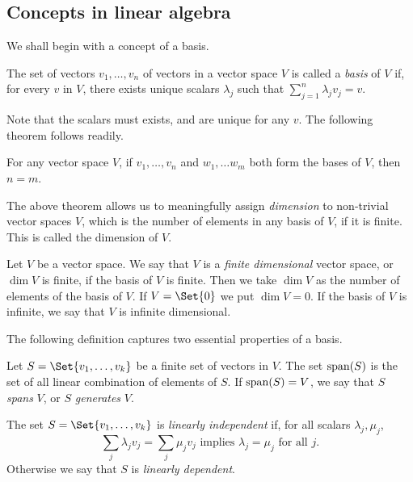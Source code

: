 \documentclass[main.tex]{subfiles}
\begin{document}
		\subsection{Concepts in linear algebra}
			We shall begin with a concept of a basis.
			\begin{definition}
				The set of vectors $v_1, \ldots, v_n$ of vectors in a vector space $V$ is called a \textit{basis} of $V$ if, for every $v$ in $V$, there exists unique scalars $\lambda_j$ such that $\sum_{j = 1}^{n}\lambda_j v_j = v$.
			\end{definition}
			Note that the scalars must exists, and are unique for any $v$. The following theorem follows readily.
			\begin{theorem}
				For any vector space $V$, if $v_1, \ldots, v_n$ and $w_1, \ldots w_m$ both form the bases of $V$, then $n = m$.
			\end{theorem}
			The above theorem allows us to meaningfully assign \textit{dimension} to non-trivial vector spaces $V$, which is the number of elements in any basis of $V$, if it is finite. This is called the dimension of $V$.
			\begin{definition}
				Let $V$ be a vector space. We say that $V$ is a \textit{finite dimensional} vector space, or $\dim V$ is finite, if the basis of $V$ is finite. Then we take $\dim V$ as the number of elements of the basis of $V$. If $V = \Set{0}$ we put $\dim V = 0$. If the basis of $V$ is infinite, we say that $V$ is infinite dimensional.
			\end{definition}
			The following definition captures two essential properties of a basis.
			\begin{definition}
				Let $S = \Set{v_1, \ldots, v_k}$ be a finite set of vectors in $V$. The set $\operatorname{span} (S)$ is the set of all linear combination of elements of $S$. If $\operatorname{span} (S) = V$, we say that $S$ \textit{spans} $V$, or $S$ \textit{generates} $V$.
			\end{definition}
			\begin{definition}
				The set $S = \Set{v_1, \ldots, v_k}$ is \textit{linearly independent} if, for all scalars $\lambda_j, \mu_j$,
				\begin{equation*}
					\sum_j \lambda_j v_j = \sum_j \mu_j v_j \text{ implies } \lambda_j = \mu_j \text{ for all $j$.}
				\end{equation*}
				Otherwise we say that $S$ is \textit{linearly dependent}.
			\end{definition}
\end{document}
